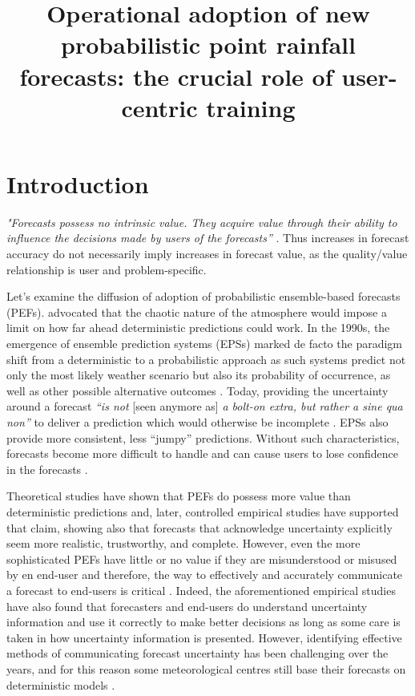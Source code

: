 \documentclass[twocol]{ametsocV5} %
\title{Operational adoption of new probabilistic point rainfall forecasts: the crucial role of user-centric training}
\affiliation{University of Reading, Reading, UK \\
European Centre for Medium-Range Weather Forecasts, Reading, UK}
\begin{document}
\maketitle


\section{Introduction}

\textit{"Forecasts possess no intrinsic value. They acquire value through their ability to influence the decisions made by users of the forecasts”} \citep{Murphy1993}. Thus increases in forecast accuracy do not necessarily imply increases in forecast value, as the quality/value relationship is user and problem-specific. \par
Let's examine the diffusion of adoption of probabilistic ensemble-based forecasts (PEFs). \citet{Lorenz1963} advocated that the chaotic nature of the atmosphere would impose a limit on how far ahead deterministic predictions could work. In the 1990s, the emergence of ensemble prediction systems (EPSs) marked de facto the paradigm shift from a deterministic to a probabilistic approach as such systems predict not only the most likely weather scenario but also its probability of occurrence, as well as other possible alternative outcomes \citep{Bauer2015,Buizza2018a,Palmer2019}. Today, providing the uncertainty around a forecast \textit{“is not} [seen anymore as] \textit{a bolt-on extra, but rather a sine qua non”} to deliver a prediction which would otherwise be incomplete \citep{Palmer2017}. EPSs also provide more consistent, less “jumpy” predictions. Without such characteristics, forecasts become more difficult to handle and can cause users to lose confidence in the forecasts \citep{Richardson2020}. \par
Theoretical studies \citep{Richardson2000,Richardson2001,Palmer2002,Zhu2002,Buizza2008} have shown that PEFs do possess more value than deterministic predictions and, later, controlled empirical studies \citep{Roulston2006,Joslyn2007,Roulston2009,Joslyn2010,Joslyn2012,Joslyn2013,Ramos2013,Arnal2016} have supported that claim, showing also that forecasts that acknowledge uncertainty explicitly seem more realistic, trustworthy, and complete. However, even the more sophisticated PEFs have little or no value if they are misunderstood or misused by en end-user and therefore, the way to effectively and accurately communicate a forecast to end-users is critical \citep{Du2007}. Indeed, the aforementioned empirical studies have also found that forecasters and end-users do understand uncertainty information and use it correctly to make better decisions as long as some care is taken in how uncertainty information is presented. However, identifying effective methods of communicating forecast uncertainty has been challenging over the years, and for this reason some meteorological centres still base their forecasts on deterministic models \citep{NationalResearchCouncil2006,AMS2008}. \par
\end{document}
